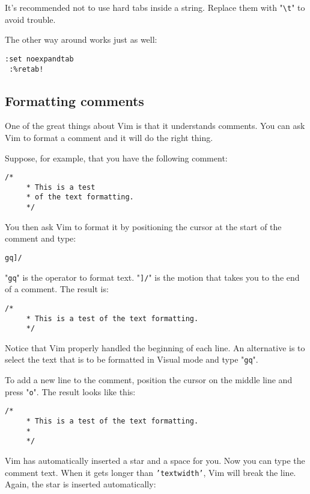 {It's recommended not to use hard tabs inside a string.
Replace them with "\texttt{\textbackslash{}t}" to avoid trouble.

The other way around works just as well:

\begin{Verbatim}[samepage=true]
 :set noexpandtab
 :%retab!
\end{Verbatim}
\subsection{Formatting comments}
One of the great things about Vim is that it understands comments.
You can ask Vim to format a comment and it will do the right thing.

Suppose, for example, that you have the following comment:

\begin{Verbatim}[samepage=true]
    /* 
     * This is a test 
     * of the text formatting. 
     */ 
\end{Verbatim}

You then ask Vim to format it by positioning the cursor at the start of the comment and type:

\begin{Verbatim}[samepage=true]
 gq]/
\end{Verbatim}

"\texttt{gq}" is the operator to format text.
"\texttt{]/}" is the motion that takes you to the end of a comment.
The result is:

\begin{Verbatim}[samepage=true]
    /* 
     * This is a test of the text formatting. 
     */ 
\end{Verbatim}

Notice that Vim properly handled the beginning of each line.
An alternative is to select the text that is to be formatted in Visual mode and type "\texttt{gq}".

To add a new line to the comment, position the cursor on the middle line and press "\texttt{o}".
The result looks like this:

\begin{Verbatim}[samepage=true]
    /* 
     * This is a test of the text formatting. 
     * 
     */ 
\end{Verbatim}

Vim has automatically inserted a star and a space for you.
Now you can type the comment text.
When it gets longer than \texttt{'textwidth'}, Vim will break the line.
Again, the star is inserted automatically:

}
